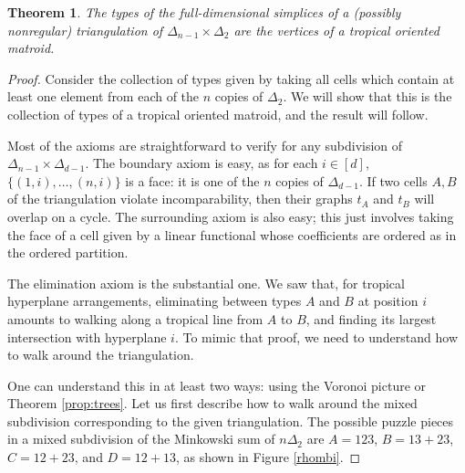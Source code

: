 \documentclass[11pt]{amsart}
\newtheorem{thm}{Theorem}[section]
\begin{document}
\begin{thm}
The types of the full-dimensional simplices of a (possibly nonregular) triangulation of $\Delta_{n-1} \times \Delta_2$ are the vertices of a tropical oriented matroid.
\end{thm}

\begin{proof}
Consider the collection of types given by taking all cells which contain at least one element from each of the $n$ copies of $\Delta_2$. %
We will show that this is the collection of types of a tropical oriented matroid, and the result will follow.

Most of the axioms are straightforward to verify for any subdivision of $\Delta_{n-1} \times \Delta_{d-1}$. The boundary axiom is easy, as for each $i\in [d]$, $\{(1, i), \ldots, (n, i)\}$ is a face: it is one of 
the $n$ copies of $\Delta_{d-1}$. If two cells $A,B$ of the triangulation violate incomparability, then their graphs $t_A$ and $t_B$ will overlap on a cycle.
The surrounding axiom is also easy; this just involves taking the face of a cell given by a 
linear functional whose coefficients are ordered as in the ordered partition.

The elimination axiom is the substantial one. 
We saw that, for tropical hyperplane arrangements, eliminating between types $A$ and $B$ at position $i$ amounts to walking along a tropical line from $A$ to $B$, and finding its largest intersection with hyperplane $i$. To mimic that proof, we need to understand how to walk around the triangulation.

One can understand this in at least two ways: using the Voronoi picture or Theorem \ref{prop:trees}. Let us first describe how to walk around the mixed subdivision corresponding to the given triangulation. The possible puzzle pieces in a mixed subdivision of the Minkowski sum of $n \Delta_2$ are 
$A=123$, $B = 13+23$, $C=12+23$, and $D=12+13$, as shown in Figure \ref{rhombi}. 



\end{proof}
\end{document}
